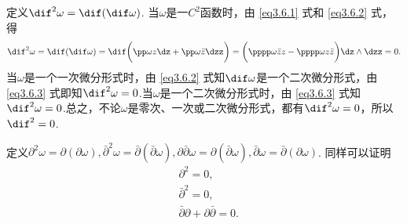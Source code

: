 定义$\dif ^2\omega=\dif (\dif \omega)$. 当$\omega$是一$C^2$函数时，由 \eqref{eq3.6.1} 式和 \eqref{eq3.6.2} 式，得
\begin{equation}\label{eq3.6.4}
\dif ^2\omega=\dif (\dif \omega)=\dif \bigg(
\pp\omega z\dz+\pp\omega{\bar z}\dzz\bigg)=\bigg(
\pppp\omega{\bar z}z-\pppp\omega z{\bar z}\bigg)\dz\wedge\dzz=0.
\end{equation}
当$\omega$是一个一次微分形式时，由 \eqref{eq3.6.2} 式知$\dif \omega$是一个二次微分形式，由 \eqref{eq3.6.3} 式即知$\dif ^2\omega=0$.当$\omega$是一个二次微分形式时，由 \eqref{eq3.6.3} 式知$\dif ^2\omega=0$.总之，不论$\omega$是零次、一次或二次微分形式，都有$\dif ^2\omega=0$，所以$\dif ^2=0$.

定义$\partial^2\omega=\partial(\partial\omega),\bar\partial^2\omega=
\bar\partial(\bar\partial\omega),\partial\bar\partial\omega=\partial(\bar\partial\omega),
\bar\partial\omega=\bar\partial(\partial\omega)$. 同样可以证明
\begin{equation}\label{eq3.6.5}
\begin{aligned}
&\partial^2=0,\\
&\bar\partial^2=0,\\
&\bar\partial\partial+\partial\bar\partial=0.
\end{aligned}
\end{equation}

